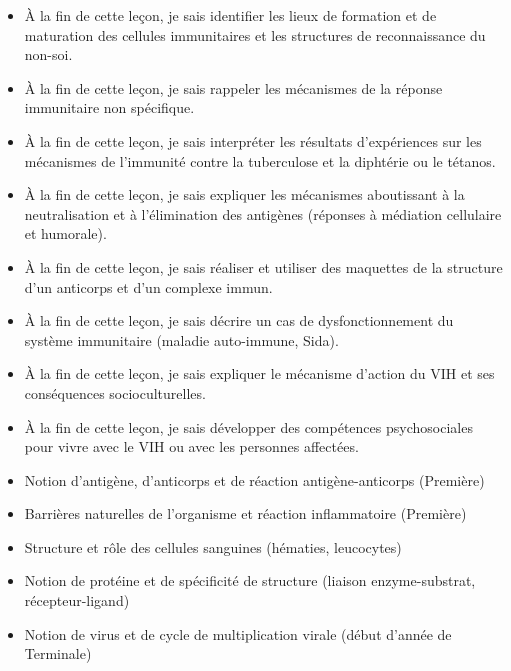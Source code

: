 \documentclass[11pt]{article}
\begin{document}
\begin{objectifs}
\begin{itemize}
\item À la fin de cette leçon, je sais identifier les lieux de formation et de maturation des cellules immunitaires et les structures de reconnaissance du non-soi.
\item À la fin de cette leçon, je sais rappeler les mécanismes de la réponse immunitaire non spécifique.
\item À la fin de cette leçon, je sais interpréter les résultats d'expériences sur les mécanismes de l'immunité contre la tuberculose et la diphtérie ou le tétanos.
\item À la fin de cette leçon, je sais expliquer les mécanismes aboutissant à la neutralisation et à l'élimination des antigènes (réponses à médiation cellulaire et humorale).
\item À la fin de cette leçon, je sais réaliser et utiliser des maquettes de la structure d'un anticorps et d'un complexe immun.
\item À la fin de cette leçon, je sais décrire un cas de dysfonctionnement du système immunitaire (maladie auto-immune, Sida).
\item À la fin de cette leçon, je sais expliquer le mécanisme d'action du VIH et ses conséquences socioculturelles.
\item À la fin de cette leçon, je sais développer des compétences psychosociales pour vivre avec le VIH ou avec les personnes affectées.
\end{itemize}
\end{objectifs}

\begin{prerequis}
\begin{itemize}
\item Notion d'antigène, d'anticorps et de réaction antigène-anticorps (Première)
\item Barrières naturelles de l'organisme et réaction inflammatoire (Première)
\item Structure et rôle des cellules sanguines (hématies, leucocytes)
\item Notion de protéine et de spécificité de structure (liaison enzyme-substrat, récepteur-ligand)
\item Notion de virus et de cycle de multiplication virale (début d'année de Terminale)
\end{itemize}
\end{prerequis}

\newpage
\end{document}

